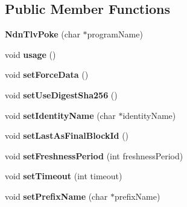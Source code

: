 \subsection*{Public Member Functions}
\begin{DoxyCompactItemize}
\item 
{\bfseries Ndn\+Tlv\+Poke} (char $\ast$program\+Name)\hypertarget{classndntlvpoke_1_1NdnTlvPoke_ac8609ab98825ad46c45896cb02a5c071}{}\label{classndntlvpoke_1_1NdnTlvPoke_ac8609ab98825ad46c45896cb02a5c071}

\item 
void {\bfseries usage} ()\hypertarget{classndntlvpoke_1_1NdnTlvPoke_ac96294e4bda7562b79e153e6e11ac399}{}\label{classndntlvpoke_1_1NdnTlvPoke_ac96294e4bda7562b79e153e6e11ac399}

\item 
void {\bfseries set\+Force\+Data} ()\hypertarget{classndntlvpoke_1_1NdnTlvPoke_af41f15ed394c64920691b0efe1ab28b5}{}\label{classndntlvpoke_1_1NdnTlvPoke_af41f15ed394c64920691b0efe1ab28b5}

\item 
void {\bfseries set\+Use\+Digest\+Sha256} ()\hypertarget{classndntlvpoke_1_1NdnTlvPoke_acc9adb7fc0ef4af409b30e28db2d983f}{}\label{classndntlvpoke_1_1NdnTlvPoke_acc9adb7fc0ef4af409b30e28db2d983f}

\item 
void {\bfseries set\+Identity\+Name} (char $\ast$identity\+Name)\hypertarget{classndntlvpoke_1_1NdnTlvPoke_a246b9e2c97177039581b1a2c51e83d25}{}\label{classndntlvpoke_1_1NdnTlvPoke_a246b9e2c97177039581b1a2c51e83d25}

\item 
void {\bfseries set\+Last\+As\+Final\+Block\+Id} ()\hypertarget{classndntlvpoke_1_1NdnTlvPoke_a002063e4dc3d2b8c7046f9bef1a632bb}{}\label{classndntlvpoke_1_1NdnTlvPoke_a002063e4dc3d2b8c7046f9bef1a632bb}

\item 
void {\bfseries set\+Freshness\+Period} (int freshness\+Period)\hypertarget{classndntlvpoke_1_1NdnTlvPoke_ad53078ec412e73265ca7b8ff12317b66}{}\label{classndntlvpoke_1_1NdnTlvPoke_ad53078ec412e73265ca7b8ff12317b66}

\item 
void {\bfseries set\+Timeout} (int timeout)\hypertarget{classndntlvpoke_1_1NdnTlvPoke_a813cfd908562f73ab49c7e17f977d659}{}\label{classndntlvpoke_1_1NdnTlvPoke_a813cfd908562f73ab49c7e17f977d659}

\item 
void {\bfseries set\+Prefix\+Name} (char $\ast$prefix\+Name)\hypertarget{classndntlvpoke_1_1NdnTlvPoke_a68b9f5bdcfd5e47eb0ea774baa3db9b4}{}\label{classndntlvpoke_1_1NdnTlvPoke_a68b9f5bdcfd5e47eb0ea774baa3db9b4}


\end{DoxyCompactItemize}
